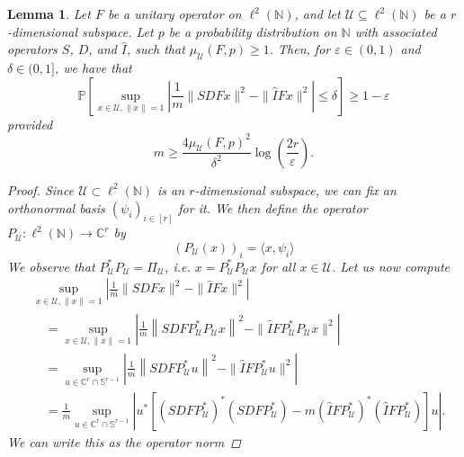 \documentclass[a4paper,oneside]{amsart}
\newtheorem{lemma}[theorem]{Lemma}
\newcommand{\lnn}{\ell^2(\mathbb{N})}
\begin{document}
\begin{lemma}\label{lemma-rip-gen}
    Let $F$ be a unitary operator on $\lnn$, and let $\mathcal{U} \subseteq \lnn$ be a $r$-dimensional subspace. Let $p$ be a probability distribution on $\mathbb{N}$ with associated operators $S$, $D$, and $\hat{I}$, such that $\mu_{\mathcal{U}}(F,p) \geq 1$. Then, for $\varepsilon\in(0,1)$ and $\delta \in (0,1]$, we have that
    \begin{equation*}
        \mathbb{P} \left[ \sup _{{x} \in \mathcal{U} , \|x\|=1}\left|\frac{1}{m}\|S D F {x}\|^2-\| \hat{I} F {x}\|^2\right| \leq \delta \right] \geq 1-\varepsilon
    \end{equation*}
    provided
    \begin{equation*}\label{rate}
        m \geq \frac{4\mu_{\mathcal{U}}(F,p)^2}{\delta^2}\log\left( \frac{2r}{\varepsilon}\right).
    \end{equation*}
    \begin{proof}
        Since $\mathcal{U} \subset \lnn$ is an $r$-dimensional subspace, we can fix an orthonormal basis $(\psi_i)_{i\in[r]}$ for it. We then define the operator $P_\mathcal{U}\colon \lnn \to \mathbb{C}^r$ by
        \begin{equation*}
            (P_\mathcal{U}(x))_i = \langle x , \psi_i \rangle
        \end{equation*}
        We observe that $P_\mathcal{U}^* P_\mathcal{U} = \Pi_\mathcal{U}$, i.e. $x=P_\mathcal{U}^* P_\mathcal{U} x$ for all $x \in \mathcal{U}$. Let us now compute
        \begin{align*}
            &\sup _{{x} \in \mathcal{U}, \|x\|=1}\left|\frac{1}{m}\|SDF{x}\|^2- \| \hat{I} F {x}\|^2 \right|\\
            &\quad =\sup _{{x} \in \mathcal{U} , \|x\|=1}\left|\frac{1}{m}\left\|SDFP_{\mathcal{U}}^* P_{\mathcal{U}} {x}\right\|^2- \| \hat{I} F P_{\mathcal{U}}^* P_{\mathcal{U}} {x}\|^2\right| \\
            &\quad  =\sup _{{u} \in \mathbb{C}^r \cap \mathbb{S}^{r-1}}\left|\frac{1}{m}\left\|SDFP_{\mathcal{U}}^* {u}\right\|^2-\| \hat{I} F P_{\mathcal{U}}^* {u}\|^2\right| \\
            &\quad  =\frac{1}{m} \sup _{{u} \in \mathbb{C}^r \cap \mathbb{S}^{r-1}}\left|{u}^*\left[\left(SDFP_{\mathcal{U}}^*\right)^*\left(SDFP_{\mathcal{U}}^*\right)-m \left( \hat{I} F P_{\mathcal{U}}^*\right)^*\left( \hat{I} F P_{\mathcal{U}}^*\right)\right] {u}\right|.
        \end{align*}
        We can write this as the operator norm

\end{proof}
\end{lemma}
\end{document}
